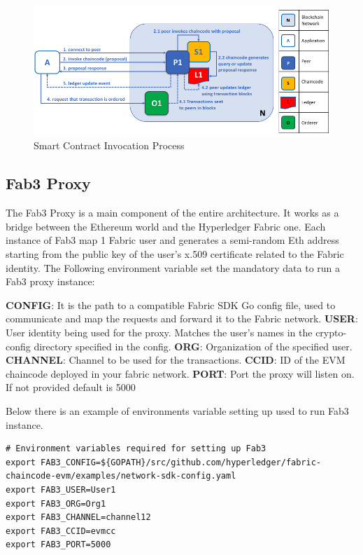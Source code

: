 \begin{figure}[h!]
    \centering
    \includegraphics[totalheight=6cm]{img/sc_invokation.png}
    \caption{Smart Contract Invocation Process}
    \label{fig:sc_invokation}
\end{figure}

\newpage
\subsection{Fab3 Proxy}

The Fab3 Proxy is a main component of the entire architecture. It works as a bridge between the Ethereum
world and the Hyperledger Fabric one. Each instance of Fab3 map 1 Fabric user and generates a semi-random 
Eth address starting from the public key of the user's x.509 certificate related to the Fabric identity. 
The Following environment variable set the mandatory data to run a Fab3 proxy instance:

\begin{outline}
    \1 \textbf{CONFIG}: It is the path to a compatible Fabric SDK Go config file, used to communicate and map the 
    requests and forward it to the Fabric network.
    \1 \textbf{USER}: User identity being used for the proxy. Matches the user's names in the crypto-config directory 
    specified in the config.
    \1 \textbf{ORG}: Organization of the specified user.
    \1 \textbf{CHANNEL}: Channel to be used for the transactions.
    \1 \textbf{CCID}: ID of the EVM chaincode deployed in your fabric network.
    \1 \textbf{PORT}: Port the proxy will listen on. If not provided default is 5000
\end{outline}

Below there is an example of environments variable setting up used to run Fab3 instance.

\begin{lstlisting}
# Environment variables required for setting up Fab3
export FAB3_CONFIG=${GOPATH}/src/github.com/hyperledger/fabric-chaincode-evm/examples/network-sdk-config.yaml 
export FAB3_USER=User1 
export FAB3_ORG=Org1
export FAB3_CHANNEL=channel12 
export FAB3_CCID=evmcc
export FAB3_PORT=5000
\end{lstlisting}

